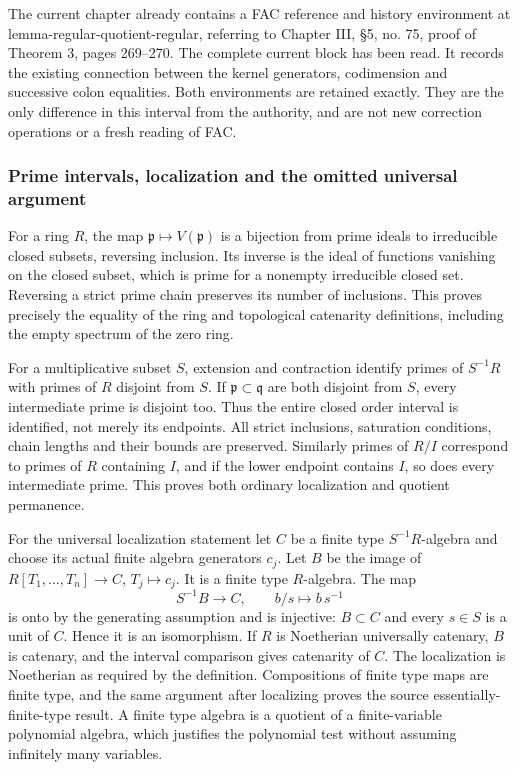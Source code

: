 The current chapter already contains a FAC reference and history environment at lemma-regular-quotient-regular, referring to Chapter III, §5, no. 75, proof of Theorem 3, pages 269--270. The complete current block has been read. It records the existing connection between the kernel generators, codimension and successive colon equalities. Both environments are retained exactly. They are the only difference in this interval from the authority, and are not new correction operations or a fresh reading of FAC.

\subsubsection{Prime intervals, localization and the omitted universal argument}\label{algebra-proof-020-prime-intervals-localization-and-the-omitted-universal-argument}

For a ring \(R\), the map \(\mathfrak p\mapsto V(\mathfrak p)\) is a bijection from prime ideals to irreducible closed subsets, reversing inclusion. Its inverse is the ideal of functions vanishing on the closed subset, which is prime for a nonempty irreducible closed set. Reversing a strict prime chain preserves its number of inclusions. This proves precisely the equality of the ring and topological catenarity definitions, including the empty spectrum of the zero ring.

For a multiplicative subset \(S\), extension and contraction identify primes of \(S^{-1}R\) with primes of \(R\) disjoint from \(S\). If \(\mathfrak p\subset\mathfrak q\) are both disjoint from \(S\), every intermediate prime is disjoint too. Thus the entire closed order interval is identified, not merely its endpoints. All strict inclusions, saturation conditions, chain lengths and their bounds are preserved. Similarly primes of \(R/I\) correspond to primes of \(R\) containing \(I\), and if the lower endpoint contains \(I\), so does every intermediate prime. This proves both ordinary localization and quotient permanence.

For the universal localization statement let \(C\) be a finite type \(S^{-1}R\)-algebra and choose its actual finite algebra generators \(c_j\). Let \(B\) be the image of \(R[T_1,\ldots,T_n]\to C\), \(T_j\mapsto c_j\). It is a finite type \(R\)-algebra. The map \[
 S^{-1}B\longrightarrow C,\qquad b/s\longmapsto b\,s^{-1}
\] is onto by the generating assumption and is injective: \(B\subset C\) and every \(s\in S\) is a unit of \(C\). Hence it is an isomorphism. If \(R\) is Noetherian universally catenary, \(B\) is catenary, and the interval comparison gives catenarity of \(C\). The localization is Noetherian as required by the definition. Compositions of finite type maps are finite type, and the same argument after localizing proves the source essentially-finite-type result. A finite type algebra is a quotient of a finite-variable polynomial algebra, which justifies the polynomial test without assuming infinitely many variables.

